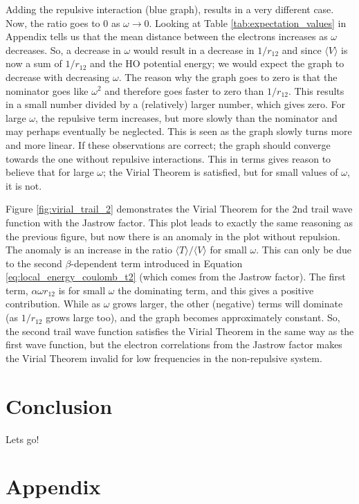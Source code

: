 \documentclass[12pt,english,a4paper]{article}
\begin{document}
Adding the repulsive interaction (blue graph), results in a very different case. Now, the ratio goes to $0$ as $\omega \rightarrow 0$. Looking at Table \ref{tab:expectation_values} in Appendix tells us that the mean distance between the electrons increases as $\omega$ decreases. So, a decrease in $\omega$ would result in a decrease in $1/r_{12}$ and since $\langle V\rangle$ is now a sum of $1/r_{12}$ and the HO potential energy; we would expect the graph to decrease with decreasing $\omega$. The reason why the graph goes to zero is that the nominator goes like $\omega^2$ and therefore goes faster to zero than $1/r_{12}$. This results in a small number divided by a (relatively) larger number, which gives zero. For large $\omega$, the repulsive term increases, but more slowly than the nominator and may perhaps eventually be neglected. This is seen as the graph slowly turns more and more linear. If these observations are correct; the graph should converge towards the one without repulsive interactions. This in terms gives reason to believe that for large $\omega$; the Virial Theorem is satisfied, but for small values of $\omega$, it is not.

Figure \ref{fig:virial_trail_2} demonstrates the Virial Theorem for the 2nd trail wave function with the Jastrow factor. This plot leads to exactly the same reasoning as the previous figure, but now there is an anomaly in the plot without repulsion. The anomaly is an increase in the ratio $\langle T\rangle /\langle V\rangle$ for small $\omega$. This can only be due to the second $\beta$-dependent term introduced in Equation \eqref{eq:local_energy_coulomb_t2} (which comes from the Jastrow factor). The first term, $\alpha\omega r_{12}$ is for small $\omega$ the dominating term, and this gives a positive contribution. While as $\omega$ grows larger, the other (negative) terms will dominate (as $1/r_{12}$ grows large too), and the graph becomes approximately constant. So, the second trail wave function satisfies the Virial Theorem in the same way as the first wave function, but the electron correlations from the Jastrow factor makes the Virial Theorem invalid for low frequencies in the non-repulsive system. 

\section{Conclusion} \label{section:conclusion}
Lets go!

\section{Appendix} \label{section:appendix}
\end{document}
